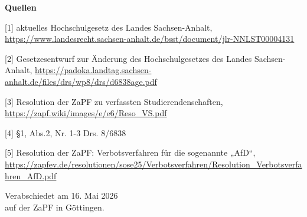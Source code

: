 \documentclass[DIV=calc]{scrartcl}
\begin{document}
\textbf{Quellen}

{[1]} aktuelles Hochschulgesetz des Landes Sachsen-Anhalt,
\url{https://www.landesrecht.sachsen-anhalt.de/bsst/document/jlr-NNLST00004131}%

{[2]} Gesetzesentwurf zur Änderung des Hochschulgesetzes des Landes Sachsen-Anhalt,
\url{https://padoka.landtag.sachsen-anhalt.de/files/drs/wp8/drs/d6838age.pdf}

{[3]} Resolution der ZaPF zu verfassten Studierendenschaften,
\url{https://zapf.wiki/images/e/e6/Reso_VS.pdf}

{[4]} §1, Abs.2, Nr. 1-3 Drs. 8/6838

{[5]} Resolution der ZaPF: Verbotsverfahren für die sogenannte „AfD“,
\url{https://zapfev.de/resolutionen/sose25/Verbotsverfahren/Resolution_Verbotsverfahren_AfD.pdf}


\vspace{1cm} 
%
\vfill
\begin{flushright}
	Verabschiedet am 16. Mai 2026 \\
	auf der ZaPF in Göttingen.
\end{flushright}
\end{document}
